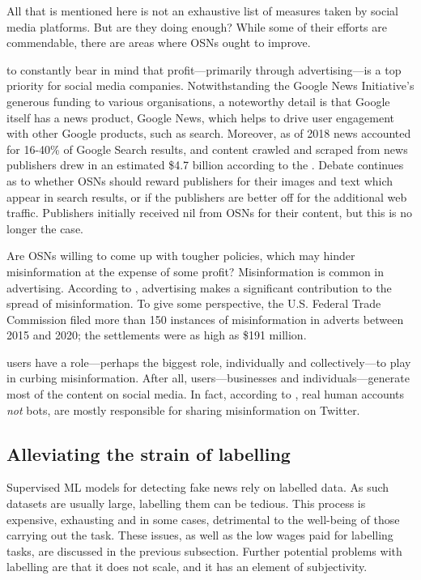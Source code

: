 All that is mentioned here is not an exhaustive list of measures taken by social media platforms. But are they doing enough? While some of their efforts are commendable, there are areas where \acp{OSN} ought to improve.

 to constantly bear in mind that profit—primarily through advertising—is a top priority for social media companies. Notwithstanding the Google News Initiative's generous funding to various organisations, a noteworthy detail is that Google itself has a news product, Google News, which helps to drive user engagement with other Google products, such as search. Moreover, as of 2018 news accounted for 16-40\% of Google Search results, and content crawled and scraped from news publishers drew in an estimated \$4.7 billion according to the . Debate continues as to whether \acp{OSN} should reward publishers for their images and text which appear in search results, or if the publishers are better off for the additional web traffic. Publishers initially received nil from \acp{OSN} for their content, but this is no longer the case.

Are \acp{OSN} willing to come up with tougher policies, which may hinder misinformation at the expense of some profit? Misinformation is common in advertising. According to , advertising makes a significant contribution to the spread of misinformation. To give some perspective, the U.S. Federal Trade Commission filed more than 150 instances of misinformation in adverts between 2015 and 2020; the settlements were as high as \$191 million.

 users have a role—perhaps the biggest role, individually and collectively—to play in curbing misinformation. After all, users—businesses and individuals—generate most of the content on social media. In fact, according to , real human accounts \emph{not} bots, are mostly responsible for sharing misinformation on Twitter.


\subsection{Alleviating the strain of labelling}
\label{ssec:1-labelling}

Supervised \ac{ML} models for detecting fake news rely on labelled data. As such datasets are usually large, labelling them can be tedious. This process is expensive, exhausting and in some cases, detrimental to the well-being of those carrying out the task. These issues, as well as the low wages paid for labelling tasks, are discussed in the previous subsection. Further potential problems with labelling are that it does not scale, and it has an element of subjectivity.

